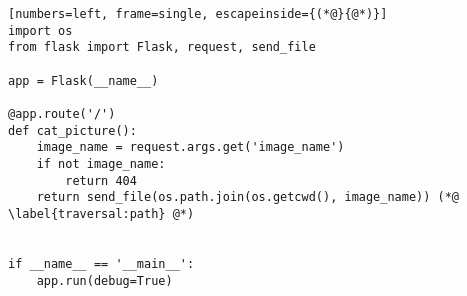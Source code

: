 \begin{lstlisting}[numbers=left, frame=single, escapeinside={(*@}{@*)}]
import os
from flask import Flask, request, send_file

app = Flask(__name__)

@app.route('/')
def cat_picture():
    image_name = request.args.get('image_name')
    if not image_name:
        return 404
    return send_file(os.path.join(os.getcwd(), image_name)) (*@ \label{traversal:path} @*)


if __name__ == '__main__':
    app.run(debug=True)
\end{lstlisting}
